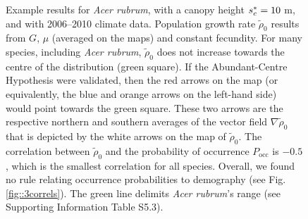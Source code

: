 \begin{figure}
	\caption{Example results for \textit{Acer rubrum}, with a canopy height $ {s}^{*}_c = 10 $ m, and with 2006--2010 climate data. Population growth rate $ \tilde \rho_0 $ results from $ G $, $ \mu $ (averaged on the maps) and constant fecundity. For many species, including \textit{Acer rubrum}, $ \tilde \rho_0 $ does not increase towards the centre of the distribution (green square). If the Abundant-Centre Hypothesis were validated, then the red arrows on the map (or equivalently, the blue and orange arrows on the left-hand side) would point towards the green square. These two arrows are the respective northern and southern averages of the vector field $ \nabla \tilde \rho_0 $ that is depicted by the white arrows on the map of $ \tilde \rho_0 $. The correlation between $ \tilde \rho_0 $ and the probability of occurrence $ P_{\text{occ}}$ is $ -0.5 $, which is the smallest correlation for all species. Overall, we found no rule relating occurrence probabilities to demography (see Fig. \ref{fig::3correls}). The green line delimits \textit{Acer rubrum}'s range (see Supporting Information Table S5.3). \label{fig::mainResults}}
\end{figure}

